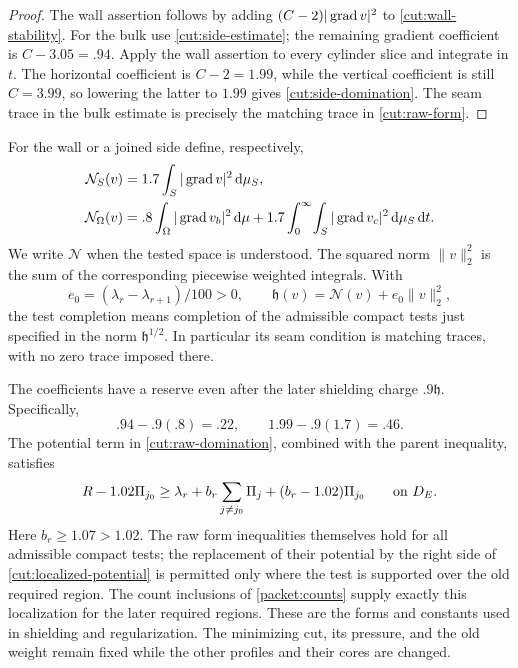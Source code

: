 \begin{proof}
The wall assertion follows by adding $(C-2)|\operatorname{grad} v|^2$ to
\cref{cut:wall-stability}.  For the bulk use
\cref{cut:side-estimate}; the remaining gradient coefficient is
$C-3.05=.94$.  Apply the wall assertion to every cylinder slice and
integrate in $t$.  The horizontal coefficient is $C-2=1.99$, while the
vertical coefficient is still $C=3.99$, so lowering the latter to $1.99$
gives \eqref{cut:side-domination}.  The seam trace in the bulk estimate
is precisely the matching trace in \eqref{cut:raw-form}.
\end{proof}

\begin{definition}\label{cut:reserve}
For the wall or a joined side define, respectively,
\begin{align*}
 \mathcal N_S(v)&=1.7\int_S|\operatorname{grad} v|^2\,\mathrm d\mu_S,\\
 \mathcal N_\Omega(v)
   &=.8\int_\Omega|\operatorname{grad} v_b|^2\,\mathrm d\mu
       +1.7\int_0^\infty\!\int_S|\operatorname{grad} v_c|^2
                                            \,\mathrm d\mu_S\,\mathrm d t.
\end{align*}
We write $\mathcal N$ when the tested space is understood.  The squared norm
$\|v\|_2^2$ is the sum of the corresponding piecewise weighted integrals.
With
\[
                  e_0=(\lambda_r-\lambda_{r+1})/100>0,
 \qquad \mathfrak h(v)=\mathcal N(v)+e_0\|v\|_2^2,
\]
the test completion means completion of the admissible compact tests
just specified in the norm $\mathfrak h^{1/2}$.  In particular its seam
condition is matching traces, with no zero trace imposed there.
\end{definition}

The coefficients have a reserve even after the later shielding charge
$.9\mathfrak h$.  Specifically,
\begin{equation}\label{cut:remaining-gradient}
                       .94-.9(.8)=.22,
             \qquad 1.99-.9(1.7)=.46.
\end{equation}
The potential term in \cref{cut:raw-domination}, combined with the
parent inequality, satisfies
\begin{equation}\label{cut:localized-potential}
 R-1.02\Pi_{j_0}
 \ge\lambda_r+b_r\sum_{j\ne j_0}\Pi_j
                         +(b_r-1.02)\Pi_{j_0}
                       \qquad\hbox{on }D_E.
\end{equation}
Here $b_r\ge1.07>1.02$.  The raw form inequalities themselves hold for
all admissible compact tests; the replacement of their potential by
the right side of \eqref{cut:localized-potential} is permitted only
where the test is supported over the old required region.
The count inclusions of \cref{packet:counts} supply exactly this
localization for the later required regions.  These are the forms and
constants used in shielding and regularization.  The minimizing cut,
its pressure, and the old weight remain fixed while the other profiles
and their cores are changed.
